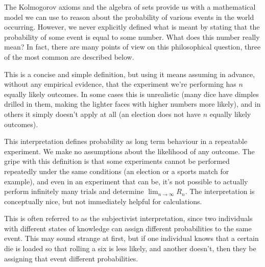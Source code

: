 The Kolmogorov axioms and the algebra of sets provide us with a mathematical model we can use to reason about the probability of various events in the world occurring. However, we never explicitly defined what is meant by stating that the probability of some event is equal to some number. What does this number really mean? In fact, there are many points of view on this philosophical question, three of the most common are described below.
\par
{}
\par
This is a concise and simple definition, but using it means assuming in advance, without any empirical evidence, that the experiment we're performing has $n$ equally likely outcomes. In some cases this is unrealistic (many dice have dimples drilled in them, making the lighter faces with higher numbers more likely), and in others it simply doesn't apply at all (an election does not have $n$ equally likely outcomes).
\par
{}
\par
This interpretation defines probability as long term behaviour in a repeatable experiment. We make no assumptions about the likelihood of any outcome. The gripe with this definition is that some experiments cannot be performed repeatedly under the same conditions (an election or a sports match for example), and even in an experiment that can be, it's not possible to actually perform infinitely many trials and determine $\lim_{n \to \infty} R_n$. The interpretation is conceptually nice, but not immediately helpful for calculations.
\par
{}
\par
This is often referred to as the subjectivist interpretation, since two individuals with different states of knowledge can assign different probabilities to the same event. This may sound strange at first, but if one individual knows that a certain die is loaded so that rolling a six is less likely, and another doesn't, then they  be assigning that event different probabilities.
